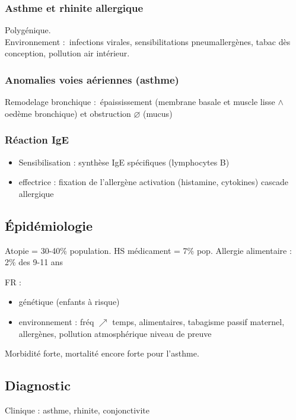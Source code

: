 \documentclass{book}
\begin{document}
\subsubsection{Asthme et rhinite allergique}
\label{sec:orgccb2391}
Polygénique.\\
Environnement : infections virales, sensibilitations pneumallergènes, tabac dès
conception, pollution air intérieur. 

\subsubsection{Anomalies voies aériennes (asthme)}
\label{sec:org9aa5747}
Remodelage bronchique : épaississement (membrane basale et muscle lisse \(\wedge\) oedème
bronchique) et obstruction \(\diameter\) (mucus)

\subsubsection{Réaction IgE}
\label{sec:org21d187e}

\begin{itemize}
\item Sensibilisation : synthèse IgE spécifiques (lymphocytes B)
\item effectrice : fixation de l'allergène \thus activation (histamine,
cytokines) \thus cascade allergique
\end{itemize}


\subsection{Épidémiologie}
\label{sec:org6e7ad5c}
Atopie = 30-40\% population. HS médicament = 7\% pop. Allergie alimentaire : 2\%
des 9-11 ans

FR : 

\begin{itemize}
\item génétique (enfants à risque)
\item environnement : fréq \(\nearrow\) temps, alimentaires, tabagisme passif
maternel, allergènes, pollution atmosphérique \danger niveau de preuve
\end{itemize}

Morbidité forte, mortalité encore forte pour l'asthme.

\subsection{Diagnostic}
\label{sec:org61b5d80}
Clinique : asthme, rhinite, conjonctivite
\end{document}
